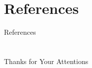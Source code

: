 \documentclass{beamer}
\begin{document}
\section{References}
\calcreferencespagetotal %
\begin{frame}[allowframebreaks]{References}
    \fontsize{9pt}{13}\selectfont
    
    
\end{frame}

\section{}

\begin{frame}
    \centering
    \Large{Thanks for Your Attentions}
\end{frame}
\end{document}
